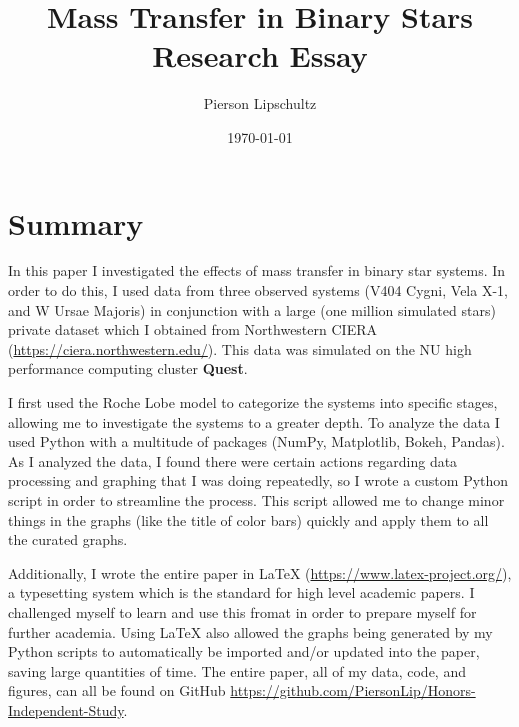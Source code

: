 \documentclass[12pt, a4paper]{article}
\title{Mass Transfer in Binary Stars Research Essay}
\author{Pierson Lipschultz}
\begin{document}
\date{\today}
\maketitle

\begin{abstract}

\end{abstract}

\section{Summary}
    In this paper I investigated the effects of mass transfer in binary star systems. In order to do this,  I used data from three observed systems (V404 Cygni, Vela X-1, and W Ursae Majoris) in conjunction with a large (one million simulated stars) private dataset which I obtained from Northwestern CIERA (\url{https://ciera.northwestern.edu/}). This data was simulated on the NU high performance computing cluster \textbf{Quest}. 

    I first used the Roche Lobe model to categorize the systems into specific stages, allowing me to investigate the systems to a greater depth. To analyze the data I used Python with a multitude of packages (NumPy, Matplotlib, Bokeh, Pandas). As I analyzed the data, I found there were certain actions regarding data processing and graphing that I was doing repeatedly, so I wrote a custom Python script in order to streamline the process. This script allowed me to change minor things in the graphs (like the title of color bars) quickly and apply them to all the curated graphs. 

	Additionally, I wrote the entire paper in LaTeX (\url{https://www.latex-project.org/}), a typesetting system which is the standard for high level academic papers. I challenged myself to learn and use this fromat in order to prepare myself for further academia. Using LaTeX also allowed the graphs being generated by my Python scripts to automatically be imported and/or updated into the paper, saving large quantities of time.
	The entire paper, all of my data, code, and figures, can all be found on GitHub \url{https://github.com/PiersonLip/Honors-Independent-Study}.
\end{document}

